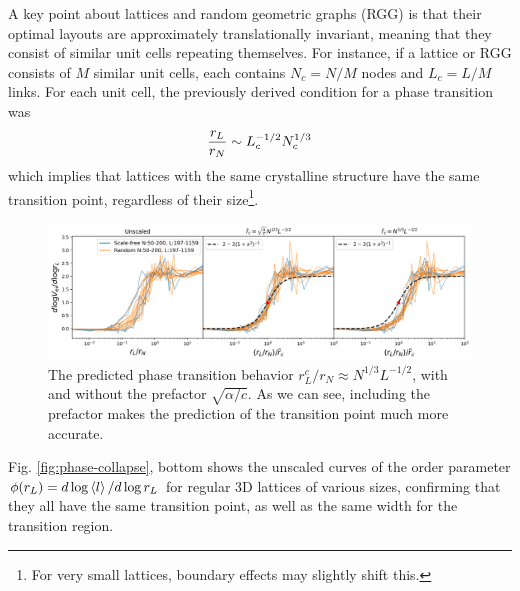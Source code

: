 \documentclass[endfloats,nofootinbib,preprint,floatfix,titlepage,superscriptaddress,linenumbers]{revtex4-1} %
\newcommand{\outNim}[1]{}
\begin{document}
{A key point about lattices and random geometric graphs (RGG) is that their optimal layouts are approximately translationally invariant, meaning that they consist of similar unit cells repeating themselves. 
For instance, if a lattice or RGG consists of $M$ similar unit cells, each contains $N_c = N/M$ nodes and $L_c=L/M$ links. 
For each unit cell, the previously derived condition for a phase transition was 
\begin{align}
    {r_L\over r_N} \sim L_c^{-1/2} N_c^{1/3} 
\label{eq:trans-lat}
\end{align}
which implies that lattices with the same crystalline structure have the same transition point, regardless of their size\footnote{For very small lattices, boundary effects may slightly shift this.}.
\begin{figure}
    \centering
    \includegraphics[width=\textwidth]{fig-09-19/phase-collapse-042018-prefactor.png}
    \caption{The predicted phase transition behavior $r^c_L/r_N \approx N^{1/3}L^{-1/2}$, with and without the prefactor $\sqrt{\alpha/c}$. 
    As we can see, including the prefactor makes the prediction of the transition point much more accurate.
    }
    \label{fig:prefactor}
\end{figure}
{Fig. \ref{fig:phase-collapse}, bottom} shows the unscaled curves of the order parameter $\phi(r_L) = d\log\left<l\right>/d\log{r_L}$ for regular 3D lattices of various sizes, confirming that they all have the same transition point, as well as the same width for the transition region. 
\outNim{
Since in a lattice the number of nodes in a unit cell is a fixed number $C$, the number of cells is actually a function of the number of nodes and this changes the scaling law to 
\[{r_L\over r_N} \sim \pr{{N\over C}}^{-1/6} L^{-1/2} N^{1/3} = C^{1/6} L^{-1/2} N^{1/6} \]
For a small network with $N\sim 100$ the extra factor of $N^{1/6}\sim 2$ may not be considerable in a log-log plot, but it can be measured in a large lattice or RGG. 
}%

}
\end{document}

